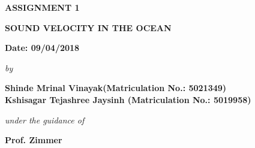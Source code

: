\begin{center}
\vspace{-2.9cm}
\vspace{1.5cm}
\bfseries{ASSIGNMENT 1}\\
\vspace{0.5cm}
\begin{large}
{\bfseries SOUND VELOCITY IN THE OCEAN }\\
\end{large}
\vspace{0.3cm}
{\bfseries Date: 09/04/2018 }\\
\vspace{0.4cm}
\begin{small}
\emph{by}\\
\end{small}
\vspace{0.4cm}
\bfseries{Shinde Mrinal Vinayak(Matriculation No.: 5021349)\\Kshisagar Tejashree Jaysinh (Matriculation No.: 5019958)}\\
\vspace{0.3cm}
\begin{small}
\emph{under the guidance of}\\
\end{small}
\vspace{0.3cm}
{\bfseries \large Prof. Zimmer}\\
\vspace{0.1cm}
\end{center}